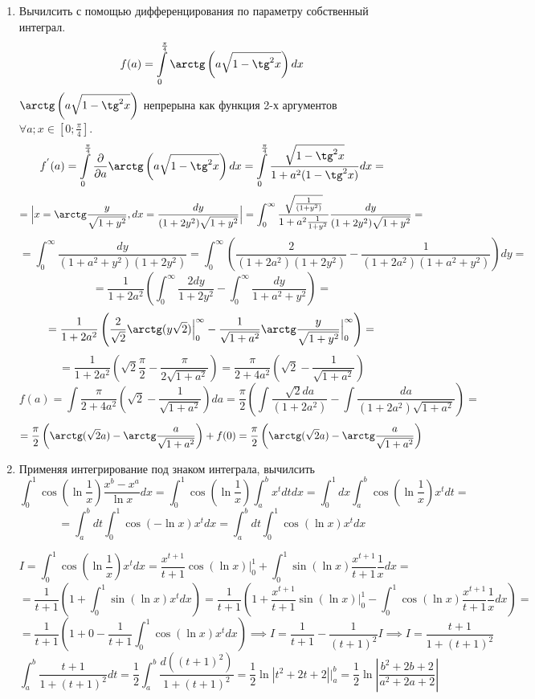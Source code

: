 \documentclass{article}
\begin{document}
\begin{large}
\begin{enumerate}
\item Вычилсить с помощью дифференцирования по параметру собственный интеграл. 
$$ f(a) = \int\limits_0^{\frac{\pi}{4}} \arctg \left( a \sqrt{1-\tg^2x} \right)dx $$
$ \arctg \left( a \sqrt{1-\tg^2x} \right) $ непрерына как функция 2-х аргументов $\forall a; x\in [0;\frac{\pi}{4}]$.
$$ f^{'}(a) = \int\limits_0^{\frac{\pi}{4}} \frac{\partial}{\partial a} \arctg \left( a \sqrt{1-\tg^2x} \right)dx = \int\limits_0^{\frac{\pi}{4}} \frac{\sqrt{1-\tg^2x}}{1 + a^2(1-\tg^2x)}  dx = $$
$$ = \Big| x = \arctg \frac{y}{\sqrt{1+y^2}}, dx = \frac{dy}{(1+2y^2) \sqrt{1+y^2}} \Big| = \int_0^\infty \frac{\sqrt{\frac{1}{(1+y^2)}}}{1+a^2\frac{1}{1+y^2}} \frac{dy}{(1+2y^2) \sqrt{1+y^2}} = $$
$$ = \int_0^\infty \frac{dy}{(1+a^2+y^2)(1+2y^2)} = \int_0^\infty \left( \frac{2}{(1+2a^2)(1+2y^2)} - \frac{1}{(1+2a^2)(1+a^2+y^2)} \right) dy = $$
$$ = \frac{1}{1+2a^2} \left( \int_0^\infty \frac{2dy}{1+2y^2} - \int_0^\infty \frac{dy}{1+a^2+y^2} \right) = $$
$$ = \frac{1}{1+2a^2} \left( \frac{2}{\sqrt{2}} \arctg(y\sqrt{2}) \Big|_0^\infty - \frac{1}{\sqrt{1+a^2}} \arctg \frac{y}{\sqrt{1+y^2}} \Big|_0^\infty \right) = $$ 
$$ = \frac{1}{1+2a^2} \left( \sqrt{2} \frac{\pi}{2} - \frac{\pi}{2\sqrt{1+a^2}} \right) = \frac{\pi}{2+4a^2} \left( \sqrt{2} - \frac{1}{\sqrt{1+a^2}} \right) $$
$$ f(a) = \int \frac{\pi}{2+4a^2} \left( \sqrt{2} - \frac{1}{\sqrt{1+a^2}} \right)da = \frac{\pi}{2} \left( \int \frac{\sqrt{2}da}{(1+2a^2)} - \int \frac{da}{(1+2a^2)\sqrt{1+a^2}} \right) = $$
$$ = \frac{\pi}{2} \left( \arctg (\sqrt{2}a) - \arctg \frac{a}{\sqrt{1+a^2}} \right) + f(0) = \frac{\pi}{2} \left( \arctg (\sqrt{2}a) - \arctg \frac{a}{\sqrt{1+a^2}} \right) $$


\item Применяя интегрирование под знаком интеграла, вычилсить 
$$ \int_0^1 \cos \left( \ln \frac{1}{x} \right) \frac{x^b - x^a}{\ln x} dx = \int_0^1 \cos \left( \ln \frac{1}{x} \right) \int_a^b x^t dt dx = \int_0^1 dx \int_a^b \cos \left( \ln \frac{1}{x} \right) x^t dt = $$
$$ =  \int_a^b dt \int_0^1 \cos \left( -\ln x \right) x^t dx = \int_a^b dt \int_0^1 \cos \left( \ln x \right) x^t dx $$


$$ I = \int_0^1 \cos \left( \ln \frac{1}{x} \right) x^t dx = \frac{x^{t+1}}{t+1} \cos (\ln x) \Big| _0^1 + \int_0^1 \sin \left( \ln x \right) \frac{x^{t+1}}{t+1} \frac{1}{x} dx = $$ 
$$ = \frac{1}{t+1} \left(1+ \int_0^1 \sin \left( \ln x \right) x^t dx \right) = \frac{1}{t+1} \left(1+ \frac{x^{t+1}}{t+1} \sin (\ln x) \Big|_0^1 - \int_0^1 \cos \left( \ln x \right) \frac{x^{t+1}}{t+1} \frac{1}{x} dx \right) = $$
$$ = \frac{1}{t+1} \left( 1 + 0 - \frac{1}{t+1} \int_0^1 \cos \left( \ln x \right) x^t dx \right) \implies I = \frac{1}{t+1} - \frac{1}{(t+1)^2}I \implies I = \frac{t+1}{1+(t+1)^2} $$
$$ \int_a^b \frac{t+1}{1+(t+1)^2} dt = \frac{1}{2}\int_a^b \frac{d((t+1)^2)}{1+(t+1)^2} = \frac{1}{2} \ln \left| t^2+2t+2 \right| \Big|_a^b = \frac{1}{2} \ln \left| \frac{b^2+2b+2}{a^2+2a+2} \right| $$


\end{enumerate}
\end{large}
\end{document}
